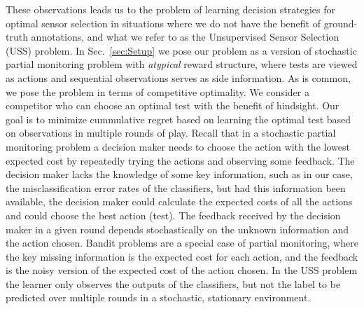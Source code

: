 \documentclass[11pt]{article} %
\newcommand{\ses}{sensor selection\xspace}
\begin{document}
These observations leads us to the problem of learning decision strategies for optimal \ses in situations where we do not have the benefit of ground-truth annotations, and what we refer to as the Unsupervised Sensor Selection (USS) problem. %
In Sec.~\ref{sec:Setup} we pose our problem as a version of stochastic partial monitoring problem \cite{BaFoPaRaSze14} with \emph{atypical} reward structure, where tests are viewed as actions and sequential observations serves as side information. As is common, we pose the problem in terms of competitive optimality. We consider a competitor who can choose an optimal test with the benefit of hindsight. Our goal is to minimize cummulative regret based on learning the optimal test based on observations in multiple rounds of play. %
Recall that in a stochastic partial monitoring problem a decision maker needs to choose the action with the lowest expected cost by repeatedly trying the actions and observing some feedback.
The decision maker lacks the knowledge of some key information, such as in our case, the misclassification
error rates of the classifiers, but had this information been available, the decision maker could calculate the
expected costs of all the actions and could choose the best action (test). The feedback received by the decision maker in a given round depends stochastically on the unknown information and the action chosen.
Bandit problems \cite{Tho33} are a special case of partial monitoring, where the key missing information is the expected
cost for each action, and the feedback is the noisy version of the expected cost of the action chosen.
In the USS problem the learner only observes the outputs of the classifiers, but not the label to be predicted over multiple rounds
in a stochastic, stationary environment. 
\end{document}
